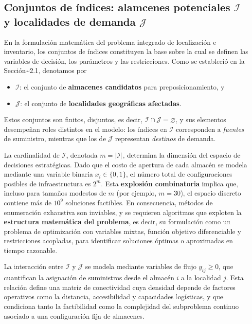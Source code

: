 \documentclass[
  spanish,
  us-letterpaper,
  DIV=11,
  numbers=noendperiod]{scrreprt}
\providecommand{\tightlist}{%
  \setlength{\itemsep}{0pt}\setlength{\parskip}{0pt}}
\numberwithin{equation}{section}
\begin{document}
\subsection{\texorpdfstring{Conjuntos de índices: alamcenes potenciales
\(\mathcal{I}\) y localidades de demanda
\(\mathcal{J}\)}{Conjuntos de índices: alamcenes potenciales \textbackslash mathcal\{I\} y localidades de demanda \textbackslash mathcal\{J\}}}\label{conjuntos-de-uxedndices-alamcenes-potenciales-mathcali-y-localidades-de-demanda-mathcalj}

En la formulación matemática del problema integrado de localización e
inventario, los conjuntos de índices constituyen la base sobre la cual
se definen las variables de decisión, los parámetros y las
restricciones. Como se estableció en la Sección\textasciitilde2.1,
denotamos por

\begin{itemize}
\tightlist
\item
  \(\mathcal{I}\): el conjunto de \textbf{almacenes candidatos} para
  preposicionamiento, y\\
\item
  \(\mathcal{J}\): el conjunto de \textbf{localidades geográficas
  afectadas}.
\end{itemize}

Estos conjuntos son finitos, disjuntos, es decir,
\(\mathcal{I} \cap \mathcal{J} = \varnothing\), y sus elementos
desempeñan roles distintos en el modelo: los índices en \(\mathcal{I}\)
corresponden a \emph{fuentes} de suministro, mientras que los de
\(\mathcal{J}\) representan \emph{destinos} de demanda.

La cardinalidad de \(\mathcal{I}\), denotada \(m = |\mathcal{I}|\),
determina la dimensión del espacio de decisiones estratégicas. Dado que
el costo de apertura de cada almacén se modela mediante una variable
binaria \(x_i \in \{0,1\}\), el número total de configuraciones posibles
de infraestructura es \(2^m\). Esta \textbf{explosión combinatoria}
implica que, incluso para tamaños modestos de \(m\) (por ejemplo,
\(m = 30\)), el espacio discreto contiene más de \(10^9\) soluciones
factibles. En consecuencia, métodos de enumeración exhaustiva son
inviables, y se requieren algoritmos que exploten la \textbf{estructura
matemática del problema}, es decir, su formulación como un problema de
optimización con variables mixtas, función objetivo diferenciable y
restricciones acopladas, para identificar soluciones óptimas o
aproximadas en tiempo razonable.

La interacción entre \(\mathcal{I}\) y \(\mathcal{J}\) se modela
mediante variables de flujo \(y_{ij} \geq 0\), que cuantifican la
asignación de suministros desde el almacén \(i\) a la localidad \(j\).
Esta relación define una matriz de conectividad cuya densidad depende de
factores operativos como la distancia, accesibilidad y capacidades
logísticas, y que condiciona tanto la factibilidad como la complejidad
del subproblema continuo asociado a una configuración fija de almacenes.
\end{document}
